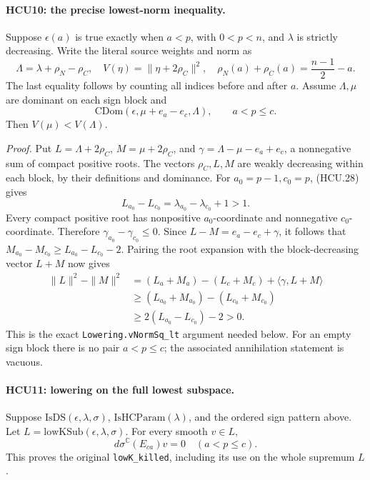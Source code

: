 \paragraph{HCU10: the precise lowest-norm inequality.}
\label{claim:HCU10}
Suppose \(\epsilon(a)\) is true exactly when \(a<p\), with
\(0<p<n\), and \(\lambda\) is strictly decreasing.
Write the literal source weights and norm as
\[
 \Lambda=\lambda+\rho_N-\rho_C,\quad
 V(\eta)=\|\eta+2\rho_C\|^2,\quad
 \rho_N(a)+\rho_C(a)=\frac{n-1}{2}-a.
 \tag{HCU.28}
\]
The last equality follows by counting all indices before and after \(a\).
Assume \(\Lambda,\mu\) are dominant on each sign block and
\[
 \mathrm{CDom}(\epsilon,\mu+e_a-e_c,\Lambda),
 \qquad a<p\le c .
 \tag{HCU.29}
\]
Then \(V(\mu)<V(\Lambda)\).

\emph{Proof.}
Put \(L=\Lambda+2\rho_C\), \(M=\mu+2\rho_C\), and
\(\gamma=\Lambda-\mu-e_a+e_c\), a nonnegative sum of compact positive
roots.  The vectors \(\rho_C,L,M\) are weakly decreasing within each
block, by their definitions and dominance.
For \(a_0=p-1,c_0=p\), (HCU.28) gives
\[
 L_{a_0}-L_{c_0}
       =\lambda_{a_0}-\lambda_{c_0}+1>1.
 \tag{HCU.30}
\]
Every compact positive root has nonpositive \(a_0\)-coordinate and
nonnegative \(c_0\)-coordinate.  Therefore
\(\gamma_{a_0}-\gamma_{c_0}\le0\).
Since \(L-M=e_a-e_c+\gamma\), it follows that
\(M_{a_0}-M_{c_0}\ge L_{a_0}-L_{c_0}-2\).
Pairing the root expansion with the block-decreasing vector \(L+M\)
now gives
\[
 \begin{split}
 \|L\|^2-\|M\|^2
 &= (L_a+M_a)-(L_c+M_c)+\langle\gamma,L+M\rangle\\
 &\ge (L_{a_0}+M_{a_0})-(L_{c_0}+M_{c_0})\\
 &\ge 2(L_{a_0}-L_{c_0})-2>0.
 \end{split}
 \tag{HCU.31}
\]
This is the exact \texttt{Lowering.vNormSq\_lt} argument needed below.
For an empty sign block there is no pair \(a<p\le c\); the associated
annihilation statement is vacuous.

\paragraph{HCU11: lowering on the full lowest subspace.}
\label{claim:HCU11}
Suppose \(\mathrm{IsDS}(\epsilon,\lambda,\sigma)\),
\(\mathrm{IsHCParam}(\lambda)\), and the ordered sign pattern above.
Let
\(L=\mathrm{lowKSub}(\epsilon,\lambda,\sigma)\).
For every smooth \(v\in L\),
\[
 d\sigma^{\mathbb C}(E_{ca})v=0\quad(a<p\le c).
 \tag{HCU.32}
\]
This proves the original \texttt{lowK\_killed}, including its use on
the whole supremum \(L\).

